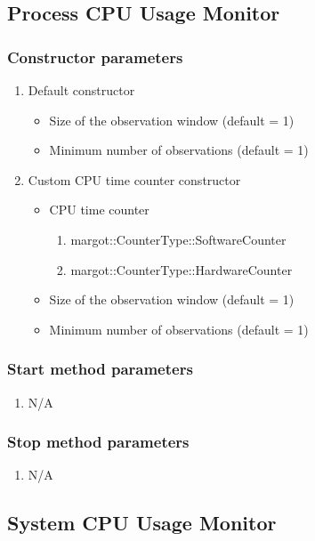 \subsection{Process CPU Usage Monitor}

\subsubsection*{Constructor parameters}
\begin{enumerate}
	\item Default constructor
		\begin{itemize}
			\item Size of the observation window (default = 1)
			\item Minimum number of observations (default = 1)
		\end{itemize}
	\item Custom CPU time counter constructor
		\begin{itemize}
			\item CPU time counter
				\begin{enumerate}
					\item margot::CounterType::SoftwareCounter
					\item margot::CounterType::HardwareCounter
				\end{enumerate}
			\item Size of the observation window (default = 1)
			\item Minimum number of observations (default = 1)
		\end{itemize}
\end{enumerate}

\subsubsection*{Start method parameters}
\begin{enumerate}
	\item[] N/A
\end{enumerate}


\subsubsection*{Stop method parameters}
\begin{enumerate}
	\item[] N/A
\end{enumerate}




\subsection{System CPU Usage Monitor}

